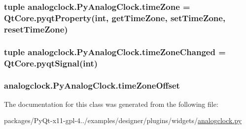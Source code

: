 \subsubsection[{time\+Zone}]{\setlength{\rightskip}{0pt plus 5cm}tuple analogclock.\+Py\+Analog\+Clock.\+time\+Zone = Qt\+Core.\+pyqt\+Property(int, {\bf get\+Time\+Zone}, {\bf set\+Time\+Zone}, {\bf reset\+Time\+Zone})\hspace{0.3cm}{\ttfamily [static]}}\label{classanalogclock_1_1PyAnalogClock_a3227cb72bfb8fe7ffe3ab44b375dc432}
\hypertarget{classanalogclock_1_1PyAnalogClock_a0551a5e06a195368d86c22623cf0f68b}{}
\subsubsection[{time\+Zone\+Changed}]{\setlength{\rightskip}{0pt plus 5cm}tuple analogclock.\+Py\+Analog\+Clock.\+time\+Zone\+Changed = Qt\+Core.\+pyqt\+Signal(int)\hspace{0.3cm}{\ttfamily [static]}}\label{classanalogclock_1_1PyAnalogClock_a0551a5e06a195368d86c22623cf0f68b}
\hypertarget{classanalogclock_1_1PyAnalogClock_a4ce878d192bcf919512801b2aa9c3611}{}
\subsubsection[{time\+Zone\+Offset}]{\setlength{\rightskip}{0pt plus 5cm}analogclock.\+Py\+Analog\+Clock.\+time\+Zone\+Offset}\label{classanalogclock_1_1PyAnalogClock_a4ce878d192bcf919512801b2aa9c3611}


The documentation for this class was generated from the following file\+:\begin{DoxyCompactItemize}
\item 
packages/\+Py\+Qt-\/x11-\/gpl-\/4../examples/designer/plugins/widgets/\hyperlink{designer_2plugins_2widgets_2analogclock_8py}{analogclock.\+py}\end{DoxyCompactItemize}
